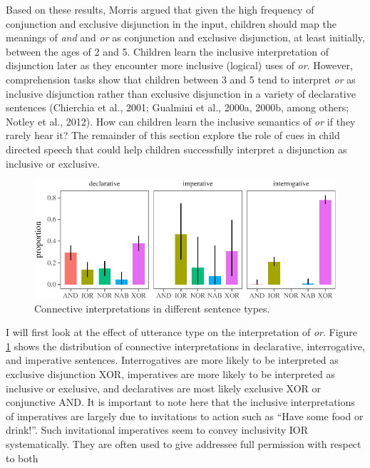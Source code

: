 \documentclass[oneside]{report}
\theoremstyle{definition}
\theoremstyle{definition}
\theoremstyle{definition}
\theoremstyle{remark}
\begin{document}
Based on these results, Morris argued that given the high frequency of
conjunction and exclusive disjunction in the input, children should map
the meanings of \emph{and} and \emph{or} as conjunction and exclusive
disjunction, at least initially, between the ages of 2 and 5. Children
learn the inclusive interpretation of disjunction later as they
encounter more inclusive (logical) uses of \emph{or}. However,
comprehension tasks show that children between 3 and 5 tend to interpret
\emph{or} as inclusive disjunction rather than exclusive disjunction in
a variety of declarative sentences (Chierchia et al., 2001; Gualmini et
al., 2000a, 2000b, among others; Notley et al., 2012). How can children
learn the inclusive semantics of \emph{or} if they rarely hear it? The
remainder of this section explore the role of cues in child directed
speech that could help children successfully interpret a disjunction as
inclusive or exclusive.
\begin{figure}[tb]

{\centering \includegraphics{figs/utterancetypePlot-1} 

}

\caption{Connective interpretations in different sentence types.}\label{fig:utterancetypePlot}
\end{figure}
I will first look at the effect of utterance type on the interpretation
of \emph{or}. Figure \ref{fig:utterancetypePlot} shows the distribution
of connective interpretations in declarative, interrogative, and
imperative sentences. Interrogatives are more likely to be interpreted
as exclusive disjunction XOR, imperatives are more likely to be
interpreted as inclusive or exclusive, and declaratives are most likely
exclusive XOR or conjunctive AND. It is important to note here that the
inclusive interpretations of imperatives are largely due to invitations
to action such as ``Have some food or drink!''. Such invitational
imperatives seem to convey inclusivity IOR systematically. They are
often used to give addressee full permission with respect to both
\end{document}
